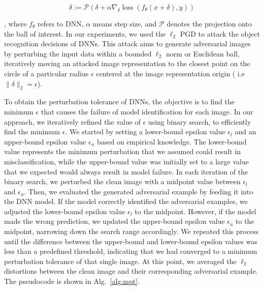 \documentclass{article}
\theoremstyle{plain}
\theoremstyle{definition}
\theoremstyle{remark}
\begin{document}
\begin{equation}
    \delta:=\mathcal{P}\left(\delta+\alpha \nabla_{\delta} \operatorname{loss}\left(f_{\theta}(x+\delta), y\right)\right)
\end{equation}

, where $f_{\theta}$ refers to DNN, $\alpha$ means step size, and $\mathcal{P}$ denotes the projection onto the ball of interest. In our experiments, we used the $\ell_2$ PGD to attack the object recognition decisions of DNNs. This attack aims to generate adversarial images by perturbing the input data within a bounded $\ell_2$ norm or Euclidean ball, iteratively moving an attacked image representation to the closest point on the circle of a particular radius $\epsilon$ centered at the image representation origin ( i.e $ \| \delta \|_2 = \epsilon $).

To obtain the perturbation tolerance of DNNs, the objective is to find the minimum $\epsilon$ that causes the failure of model identification for each image. In our approach, we iteratively refined the value of $\epsilon$ using binary search, to efficiently find the minimum $\epsilon$. We started by setting a lower-bound epsilon value ${\epsilon}_{l}$ and an upper-bound epsilon value ${\epsilon}_{u}$ based on empirical knowledge. The lower-bound value represents the minimum perturbation that we assumed could result in misclassification, while the upper-bound value was initially set to a large value that we expected would always result in model failure. In each iteration of the binary search, we perturbed the clean image with a midpoint value between ${\epsilon}_{l}$ and ${\epsilon}_{u}$. Then, we evaluated the generated adversarial example by feeding it into the DNN model. If the model correctly identified the adversarial examples, we adjusted the lower-bound epsilon value ${\epsilon}_{l}$ to the midpoint. However, if the model made the wrong prediction, we updated the upper-bound epsilon value ${\epsilon}_{u}$ to the midpoint, narrowing down the search range accordingly. We repeated this process until the difference between the upper-bound and lower-bound epsilon values was less than a predefined threshold, indicating that we had converged to a minimum perturbation tolerance of that single image. At this point, we averaged the $\ell_2$ distortions between the clean image and their corresponding adversarial example. The pseudocode is shown in Alg.~\ref{alg:mpt}.  
\end{document}
